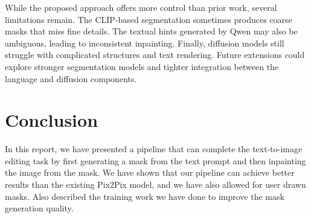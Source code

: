 \documentclass{article}
\begin{document}
While the proposed approach offers more control than prior work, several
limitations remain. The CLIP-based segmentation sometimes produces coarse masks
that miss fine details. The textual hints generated by Qwen may also be
ambiguous, leading to inconsistent inpainting. Finally, diffusion models still
struggle with complicated structures and text rendering. Future extensions could
explore stronger segmentation models and tighter integration between the
language and diffusion components.


\section{Conclusion}


In this report, we have presented a pipeline that can complete the text-to-image editing task by first generating a mask from the text prompt and then inpainting the image from the mask. We have shown that our pipeline can achieve better results than the existing Pix2Pix model, and we have also allowed for user drawn masks. Also described the training work we have done to improve the mask generation quality.
\end{document}
